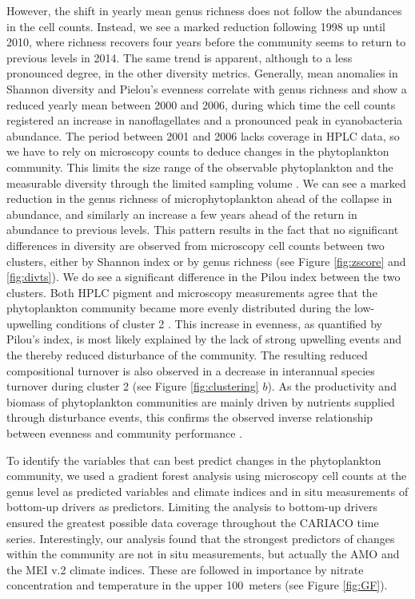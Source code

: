 \documentclass[draft]{agujournal2019}
\begin{document}
However, the shift in yearly mean genus richness does not follow the abundances in the cell counts. Instead, we see a marked reduction following 1998 up until 2010, where richness recovers four years before the community seems to return to previous levels in 2014. The same trend is apparent, although to a less pronounced degree, in the other diversity metrics. Generally, mean anomalies in Shannon diversity and Pielou's evenness correlate with genus richness and show a reduced yearly mean between 2000 and 2006, during which time the cell counts registered an increase in nanoflagellates and a pronounced peak in cyanobacteria abundance. 
The period between 2001 and 2006 lacks coverage in HPLC data, so we have to rely on microscopy counts to deduce changes in the phytoplankton community. This limits the size range of the observable phytoplankton and the measurable diversity through the limited sampling volume \cite{cermeno_sampling_2014}. We can see a marked reduction in the genus richness of microphytoplankton ahead of the collapse in abundance, and similarly an increase a few years ahead of the return in abundance to previous levels. 
This pattern results in the fact that no significant differences in diversity are observed from microscopy cell counts between two clusters, either by Shannon index or by genus richness (see Figure \ref{fig:zscore} and \ref{fig:divts}).
We do see a significant difference in the Pilou index between the two clusters. Both HPLC pigment and microscopy measurements agree that the phytoplankton community became more evenly distributed during the low-upwelling conditions of cluster 2 \cite{pinckney_phytoplankton_2015}. This increase in evenness, as quantified by Pilou's index, is most likely explained by the lack of strong upwelling events and the thereby reduced disturbance of the community. The resulting reduced compositional turnover is also observed in a decrease in interannual species turnover during cluster 2 (see Figure \ref{fig:clustering} $b$). As the productivity and biomass of phytoplankton communities are mainly driven by nutrients supplied through disturbance events, this confirms the observed inverse relationship between evenness and community performance \cite{lehtinen_phytoplankton_2017, otero_phytoplankton_2020}.


To identify the variables that can best predict changes in the phytoplankton community, we used a gradient forest analysis using microscopy cell counts at the genus level as predicted variables and climate indices and in situ measurements of bottom-up drivers as predictors. Limiting the analysis to bottom-up drivers ensured the greatest possible data coverage throughout the CARIACO time series. Interestingly, our analysis found that the strongest predictors of changes within the community are not in situ measurements, but actually the AMO and the MEI v.2 climate indices. These are followed in importance by nitrate concentration and temperature in the upper \qty{100}{meters} (see Figure \ref{fig:GF}).
\end{document}
